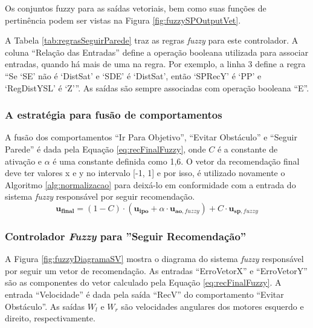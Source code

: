	Os conjuntos fuzzy para as saídas vetoriais, bem como suas funções de pertinência podem ser
	vistas na Figura \ref{fig:fuzzySPOutputVet}.

	
	
	A Tabela \ref{tab:regrasSeguirParede} traz as regras \textit{fuzzy} para este controlador.
	A coluna ``Relação das Entradas'' define a operação booleana utilizada para associar 
	entradas, quando há mais de uma na regra. Por exemplo, a linha 3 define a regra ``Se 
	`SE' não é `DistSat' e `SDE' é `DistSat', então `SPRecY' é `PP' e `RegDistYSL' é `Z'''.
	As saídas são sempre associadas com operação booleana ``E''.
	
	
	
	\subsubsection{A estratégia para fusão de comportamentos}
	
	A fusão dos comportamentos ``Ir Para Objetivo'', ``Evitar Obstáculo'' e ``Seguir Parede''
	é dada pela Equação \ref{eq:recFinalFuzzy}, onde $C$ é a constante de ativação e $\alpha$ 
	é uma constante definida como 1,6. O vetor da recomendação final deve ter valores x e y no 
	intervalo [-1, 1] e por isso, é utilizado novamente o Algoritmo \ref{alg:normalizacao} 
	para deixá-lo em conformidade com a entrada do sistema \textit{fuzzy} responsável por 
	seguir recomendação.
	\begin{equation}
		\label{eq:recFinalFuzzy}
			\mathbf{u_{final}} = 
			(1 - C) \cdot (\mathbf{u_{ipo}} + \alpha \cdot \mathbf{u_{ao, \mathit{fuzzy}}})
			+ C \cdot \mathbf{u_{sp, \mathit{fuzzy}}}
	\end{equation}
	
	\subsubsection{Controlador \textit{Fuzzy} para ''Seguir Recomendação''}
	
	A Figura \ref{fig:fuzzyDiagramaSV} mostra o diagrama do sistema \textit{fuzzy} responsável 
	por seguir um vetor de recomendação. As entradas ``ErroVetorX'' e ``ErroVetorY'' são as 
	componentes do vetor calculado pela Equação \ref{eq:recFinalFuzzy}. A entrada 
	``Velocidade'' é dada pela saída ``RecV'' do comportamento ``Evitar Obstáculo''. As
	saídas $W_l$ e $W_r$ são velocidades angulares dos motores esquerdo e direito, 
	respectivamente.
	
